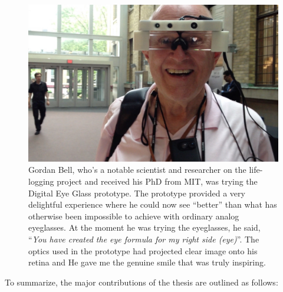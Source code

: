 
\begin{figure}
\center
 \includegraphics[width=5in]{ch7/figures/GordenBell.jpg}
 \caption{ Gordan Bell, who's a notable scientist and researcher on the life-logging project and received his PhD from MIT, was trying the Digital Eye Glass prototype.  The prototype provided a very delightful experience where he could now see ``better'' than what has otherwise been impossible to achieve with ordinary analog eyeglasses. At the moment he was trying the eyeglasses, he said, ``\textit{You have created the eye formula for my right side (eye)}''. The optics used in the prototype had projected clear image onto his retina and  He gave me the genuine smile that was truly inspiring.}
 \label{fig:gordanbell}
\end{figure}



To summarize, the major contributions of the thesis are outlined as follows: 

